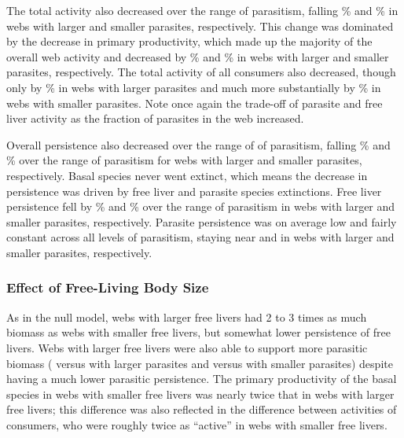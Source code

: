 \documentclass[/home/nkappler/Research/Dissertation/dissertation.tex]{subfiles}
\begin{document}
\begin{bibunit}
The total activity also decreased over the range of parasitism, falling
\% and
\% in webs with larger and
smaller parasites, respectively. This change was dominated by the decrease in
primary productivity, which made up the majority of the overall web activity
and decreased by \% and
\% in webs with larger
and smaller parasites, respectively. The total activity of all consumers also
decreased, though only by \%
in webs with larger parasites and much more substantially by
\% in webs with smaller
parasites. Note once again the trade-off of parasite and free liver activity as
the fraction of parasites in the web increased.

Overall persistence also decreased over the range of of parasitism, falling
\% and
\% over the range of
parasitism for webs with larger and smaller parasites, respectively. Basal
species never went extinct, which means the decrease in persistence was driven
by free liver and parasite species extinctions. Free liver persistence fell by
\% and
\% over the range of
parasitism in webs with larger and smaller parasites, respectively. Parasite
persistence was on average low and fairly constant across all levels of
parasitism, staying near 
and  in webs with
larger and smaller parasites, respectively.


\subsubsection{Effect of Free-Living Body Size}

As in the null model, webs with larger free livers had 2 to 3 times as much
biomass as webs with smaller free livers, but somewhat lower persistence of
free livers. Webs with larger free livers were also able to support more
parasitic biomass (\pn[precision=2]{\bigFreeBigParaParaBio} versus
\pn[precision=2]{\smallFreeBigParaParaBio} with larger parasites and
\pn[precision=2]{\bigFreeSmallParaParaBio} versus
\pn[precision=2]{\smallFreeSmallParaParaBio} with smaller parasites) despite
having a much lower parasitic persistence. The primary productivity of the
basal species in webs with smaller free livers was nearly twice that in webs
with larger free livers; this difference was also reflected in the difference
between activities of consumers, who were roughly twice as ``active'' in webs
with smaller free livers. 


\end{bibunit}
\end{document}
